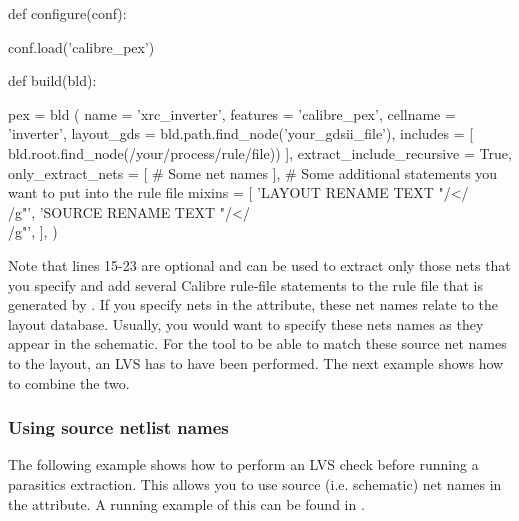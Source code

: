 \begin{lstwscript}
def configure(conf):

    conf.load('calibre_pex')

def build(bld):

    pex = bld (
        name = 'xrc_inverter',
        features = 'calibre_pex',
        cellname = 'inverter',
        layout_gds = bld.path.find_node('your_gdsii_file'),
        includes = [
            bld.root.find_node(/your/process/rule/file))
        ],
        extract_include_recursive = True,
        only_extract_nets = [
            # Some net names
        ],
        # Some additional statements you want to put into the rule file
        mixins = [
            'LAYOUT RENAME TEXT "/</\\[/g" "/>/\\]/g"',
            'SOURCE RENAME TEXT "/</\\[/g" "/>/\\]/g"',
        ],
    )
\end{lstwscript}

Note that lines 15-23 are optional and can be used to extract only those nets
that you specify and add several Calibre rule-file statements to the rule file
that is generated by .
If you specify nets in the  attribute, these net names
relate to the layout database. Usually, you would want to specify these nets
names as they appear in the schematic. For the tool to be able to match these
source net names to the layout, an LVS has to have been performed. The next
example shows how to combine the two.

\subsubsection{Using source netlist names}
The following example shows how to perform an \gls{LVS} check before running a
parasitics extraction. This allows you to use source (i.e. schematic) net names
in the  attribute.
A running example of this can be found in
.

